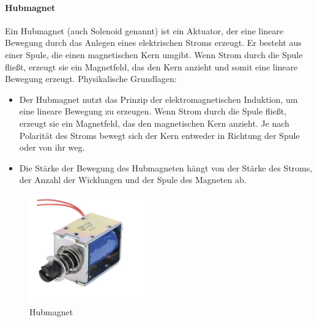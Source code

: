 \paragraph{Hubmagnet}
Ein Hubmagnet (auch Solenoid genannt) ist ein Aktuator, der eine lineare Bewegung durch das Anlegen eines elektrischen
Stroms erzeugt. Er besteht aus einer Spule, die einen magnetischen Kern umgibt. Wenn Strom durch die Spule fließt, erzeugt
sie ein Magnetfeld, das den Kern anzieht und somit eine lineare Bewegung erzeugt.\newline
Physikalische Grundlagen:
\begin{itemize}
	\item Der Hubmagnet nutzt das Prinzip der elektromagnetischen Induktion, um eine lineare Bewegung zu erzeugen. Wenn Strom
	durch die Spule fließt, erzeugt sie ein Magnetfeld, das den magnetischen Kern anzieht. Je nach Polarität des Stroms bewegt
	sich der Kern entweder in Richtung der Spule oder von ihr weg.
	\item Die Stärke der Bewegung des Hubmagneten hängt von der Stärke des Stroms, der Anzahl der Wicklungen und der
	Spule des Magneten ab.
\end{itemize}
\begin{figure}[htbp]
	\centering
	\includegraphics[width=5cm]{img/Hubmagnet}
	\caption{Hubmagnet}
	\label{fig:Hubmagnet}
\end{figure}

